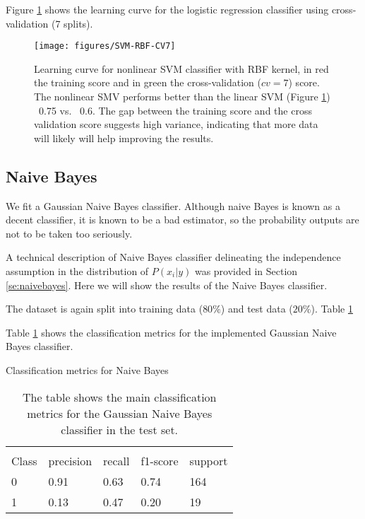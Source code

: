 \documentclass[11pt]{article}
\begin{document}
Figure \ref{fig:svm-cv7} shows the learning curve for the logistic regression classifier using cross-validation (7 splits).
\begin{figure}[H]
        \centering
        \texttt{[image: figures/SVM-RBF-CV7]}
        \caption{Learning curve for nonlinear SVM classifier with RBF kernel, in red the training score and in green the cross-validation ($cv=7$) score. The nonlinear SMV performs better than the linear SVM (Figure \ref{fig:svm-cv7}) ~0.75 vs. ~0.6. The gap between the training score and the cross validation score suggests high variance, indicating that more data will likely will help improving the results. 
        }
\label{fig:svm-cv7}
\end{figure}

\subsection{Naive Bayes}
\label{se:resnaivebayes}

We fit a Gaussian Naive Bayes classifier. Although naive Bayes is known as a decent classifier, it is known to be a bad estimator, so the probability outputs are not to be taken too seriously. %

A technical description of Naive Bayes classifier delineating the independence assumption in the distribution of $P(x_i | y)$ was provided in Section \ref{se:naivebayes}. Here we will show the results of the Naive Bayes classifier.

The dataset is again split into training data ($80\%$) and test data ($20\%$). Table \ref{tab:naive}

Table \ref{tab:naive} shows the classification metrics for the implemented Gaussian Naive Bayes classifier.
\begin{table}[H]
\caption{Classification metrics for Naive Bayes} \label{tab:naive} 
\begin{center} 
\begin{tabular}{lllll}
\hline
\multicolumn{1}{c}{} \\
Class & precision & recall & f1-score & support     \\
\hline
0 & 0.91  &    0.63   &   0.74   &    164 \\
1 & 0.13  &    0.47   &   0.20   &    19 \\
\hline
\end{tabular}
\caption{The table shows the main classification metrics for the Gaussian Naive Bayes classifier in the test set.}
\end{center}
\end{table}
\end{document}
